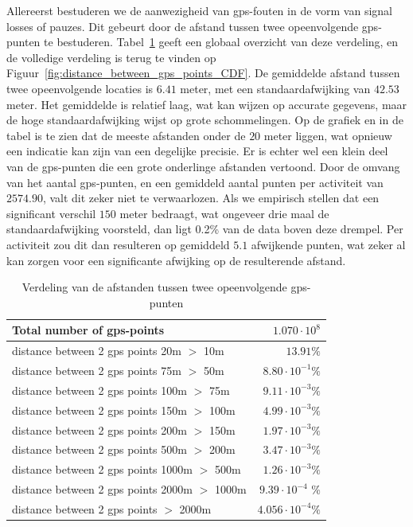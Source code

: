Allereerst bestuderen we de aanwezigheid van \ac{gps}-fouten in de vorm van
signal losses of pauzes. Dit gebeurt door de afstand tussen twee opeenvolgende
\ac{gps}-punten te bestuderen.
Tabel~\ref{tab:distance_between_gps_points_table} geeft een globaal overzicht
van deze verdeling, en de volledige verdeling is terug te vinden op
Figuur~\ref{fig:distance_between_gps_points_CDF}. De gemiddelde afstand tussen
twee opeenvolgende locaties is $6.41$ meter, met een standaardafwijking van
$42.53$ meter. Het gemiddelde is relatief laag, wat kan wijzen op accurate
gegevens, maar de hoge standaardafwijking wijst op grote schommelingen. Op de
grafiek en in de tabel is te zien dat de meeste afstanden onder de $20$ meter
liggen, wat opnieuw een indicatie kan zijn van een degelijke precisie. Er is
echter wel een klein deel van de \ac{gps}-punten die een grote onderlinge
afstanden vertoond. Door de omvang van het aantal \ac{gps}-punten, en een
gemiddeld aantal punten per activiteit van $2574.90$, valt dit zeker niet te
verwaarlozen. Als we empirisch stellen dat een significant verschil $150$ meter
bedraagt, wat ongeveer drie maal de standaardafwijking voorsteld, dan ligt
0.2\% van de data boven deze drempel. Per activiteit zou dit dan resulteren op
gemiddeld $5.1$ afwijkende punten, wat zeker al kan zorgen voor een
significante afwijking op de resulterende afstand.
\begin{table}[h]
    \centering
    \begin{tabular}{lr}
        \toprule
        \midrule
        Total number of gps-points                    & $1.070 \cdot 10^8$       \\
        \hline
        distance between 2 gps points 20m $>$ 10m     & $13.91\%$                \\
        distance between 2 gps points 75m $>$ 50m     & $8.80 \cdot 10^{-1}\%$   \\
        distance between 2 gps points 100m $>$ 75m    & $9.11 \cdot 10^{-3}\%$   \\
        distance between 2 gps points 150m $>$ 100m   & $4.99 \cdot 10^{-3}\%$   \\
        distance between 2 gps points 200m $>$ 150m   & $1.97 \cdot 10^{-3}\%$   \\
        distance between 2 gps points 500m $>$ 200m   & $3.47 \cdot  10^{-3} \%$ \\
        distance between 2 gps points 1000m $>$ 500m  & $1.26 \cdot 10^{-3} \%$  \\
        distance between 2 gps points 2000m $>$ 1000m & $9.39 \cdot 10^{-4}$ \%  \\
        distance between 2 gps points $>$ 2000m       & $4.056 \cdot 10^{-4} \%$ \\
        \midrule
        \bottomrule
    \end{tabular}
    \captionsetup{justification=centering}
    \caption{Verdeling van de afstanden tussen twee opeenvolgende gps-punten}\label{tab:distance_between_gps_points_table}
\end{table}
